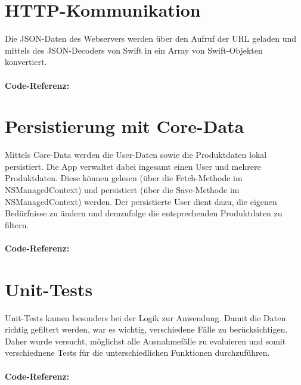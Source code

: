 \documentclass[12pt,titlepage]{article}
\begin{document}
\section*{HTTP-Kommunikation}
Die JSON-Daten des Webservers werden über den Aufruf der  URL geladen und mittels des JSON-Decoders von Swift in ein Array von Swift-Objekten konvertiert.\\
\\
\textbf{Code-Referenz: }\\ 

\section*{Persistierung mit Core-Data}
Mittels Core-Data werden die User-Daten sowie die Produktdaten lokal persistiert. Die App verwaltet dabei ingesamt einen User und mehrere Produktdaten. Diese können gelesen (über die Fetch-Methode im NSManagedContext) und persistiert (über die Save-Methode im NSManagedContext) werden. Der persistierte User dient dazu, die eigenen Bedürfnisse zu ändern und demzufolge die entsprechenden Produktdaten zu filtern.\\
\\
\textbf{Code-Referenz: }\\ 

\section*{Unit-Tests}
Unit-Tests kamen besonders bei der Logik zur Anwendung. Damit die Daten richtig gefiltert werden, war es wichtig, verschiedene Fälle zu berücksichtigen. Daher wurde versucht, möglichst alle Ausnahmefälle zu evaluieren und somit verschiednene Tests für die unterschiedlichen Funktionen durchzuführen.\\
\\
\textbf{Code-Referenz: }\\ 
\end{document}
